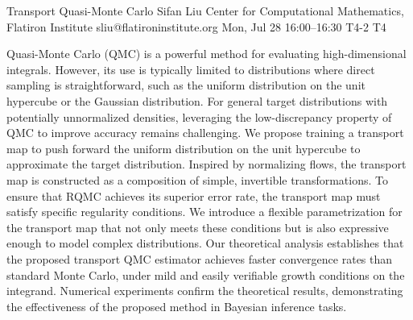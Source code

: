 \documentclass[12pt,lettersize,oneside]{book} %
\begin{document}
\begin{talk}
  {Transport Quasi-Monte Carlo}%
  {Sifan Liu}%
  {Center for Computational Mathematics, Flatiron Institute}%
  {sliu@flatironinstitute.org}%
  {}%
  {}%
  {Mon, Jul 28 16:00--16:30}%
  {T4-2}%
  {T4}%
  {}%
  
    
   
Quasi-Monte Carlo (QMC) is a powerful method for evaluating high-dimensional integrals. However, its use is typically limited to distributions where direct sampling is straightforward, such as the uniform distribution on the unit hypercube or the Gaussian distribution. For general target distributions with potentially unnormalized densities, leveraging the low-discrepancy property of QMC to improve accuracy remains challenging. We propose training a transport map to push forward the uniform distribution on the unit hypercube to approximate the target distribution. Inspired by normalizing flows, the transport map is constructed as a composition of simple, invertible transformations. To ensure that RQMC achieves its superior error rate, the transport map must satisfy specific regularity conditions. We introduce a flexible parametrization for the transport map that not only meets these conditions but is also expressive enough to model complex distributions. Our theoretical analysis establishes that the proposed transport QMC estimator achieves faster convergence rates than standard Monte Carlo, under mild and easily verifiable growth conditions on the integrand. Numerical experiments confirm the theoretical results, demonstrating the effectiveness of the proposed method in Bayesian inference tasks.


\medskip


\end{talk}
\end{document}
